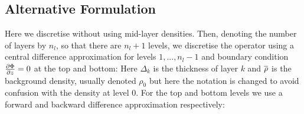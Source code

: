 \documentclass[10pt]{article}
\begin{document}
\subsection{Alternative Formulation}

Here we discretise without using mid-layer densities. Then, denoting the number of layers by $n_{l}$, so that there are $n_{l}+1$ levels, we discretise the operator using a central difference approximation for levels $1,...,n_{l}-1$ and boundary condition $\frac{\partial \Phi}{\partial z} = 0$ at the top and bottom:
Here $\Delta_{k}$ is the thickness of layer $k$ and $\overline{\rho}$ is the background density, usually denoted $\rho_{0}$ but here the notation is changed to avoid confusion with the density at level $0$. For the top and bottom levels we use a forward and backward difference approximation respectively:
	
\end{document}
